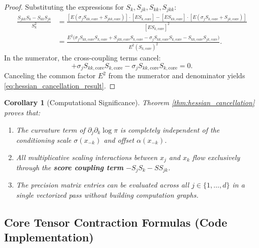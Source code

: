 \documentclass[11pt,a4paper]{article}
\theoremstyle{plain}
\newtheorem{corollary}[theorem]{Corollary}
\theoremstyle{definition}
\theoremstyle{remark}
\begin{document}
\begin{proof}
Substituting the expressions for $S_k, S_{jk}, S_{kk}, S_{jkk}$:
\begin{align}
    \frac{S_{jkk} S_k - S_{kk} S_{jk}}{S_k^2} &= \frac{\left[ E (\sigma_j S_{kk, \text{core}} + S_{jkk, \text{core}}) \right] \cdot \left[ E S_{k, \text{core}} \right] - \left[ E S_{kk, \text{core}} \right] \cdot \left[ E (\sigma_j S_{k, \text{core}} + S_{jk, \text{core}}) \right]}{\left[ E S_{k, \text{core}} \right]^2} \nonumber \\
    &= \frac{E^2 \Big( \sigma_j S_{kk, \text{core}} S_{k, \text{core}} + S_{jkk, \text{core}} S_{k, \text{core}} - \sigma_j S_{kk, \text{core}} S_{k, \text{core}} - S_{kk, \text{core}} S_{jk, \text{core}} \Big)}{E^2 (S_{k, \text{core}})^2}.
\end{align}
In the numerator, the cross-coupling terms cancel:
\begin{equation}
    +\sigma_j S_{kk, \text{core}} S_{k, \text{core}} - \sigma_j S_{kk, \text{core}} S_{k, \text{core}} = 0.
\end{equation}
Canceling the common factor $E^2$ from the numerator and denominator yields \eqref{eq:hessian_cancellation_result}.
\end{proof}

\begin{corollary}[Computational Significance]
Theorem \ref{thm:hessian_cancellation} proves that:
\begin{enumerate}
    \item The curvature term of $\partial_j \partial_k \log \pi$ is completely independent of the conditioning scale $\sigma(x_{-k})$ and offset $\alpha(x_{-k})$.
    \item All multiplicative scaling interactions between $x_j$ and $x_k$ flow exclusively through the \textbf{score coupling term} $-S_j S_k - S S_{jk}$.
    \item The precision matrix entries can be evaluated across all $j \in \{1, \dots, d\}$ in a single vectorized pass without building computation graphs.
\end{enumerate}
\end{corollary}

\subsection{Core Tensor Contraction Formulas (Code Implementation)}
\end{document}
